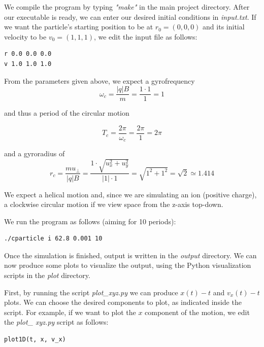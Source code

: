 \documentclass[11pt]{report}
\begin{document}
We compile the program by typing \emph{"make"} in the main project directory. After our executable is ready, we can enter our desired initial conditions in \emph{input.txt}. If we want the particle's starting position to be at $r_0 = (0,0,0)$ and its initial velocity to be $v_0 = (1, 1, 1)$, we edit the input file as follows:

\begin{lstlisting}
r 0.0 0.0 0.0
v 1.0 1.0 1.0
\end{lstlisting}

From the parameters given above, we expect a gyrofrequency 
\begin{equation}
\omega_c = \frac{|q|B}{m} = \frac{1 \cdot 1}{1} = 1
\end{equation}

and thus a period of the circular motion

\begin{equation}
T_c = \frac{2 \pi}{\omega_c} = \frac{2 \pi}{1} = 2 \pi
\end{equation}

and a gyroradius of 
\begin{equation}
r_c = \frac{m u_{\bot}}{|q|B} = \frac{1 \cdot \sqrt{u_x^2 + u_y^2}}{|1| \cdot 1}
= \sqrt{1^2 + 1^2} = \sqrt{2} \simeq 1.414
\end{equation}

We expect a helical motion and, since we are simulating an ion (positive charge), a clockwise circular motion if we view space from the z-axis top-down.
\newline

We run the program as follows (aiming for 10 periods):

\begin{lstlisting}
./cparticle i 62.8 0.001 10
\end{lstlisting}

Once the simulation is finished, output is written in the \emph{output} directory. We can now produce some plots to visualize the output, using the Python visualization scripts in the \emph{plot} directory.
\newline

First, by running the script \emph{plot\_xyz.py} we can produce $x(t) - t$ and $v_x(t) - t$ plots. We can choose the desired components to plot, as indicated inside the script. For example, if we want to plot the $x$ component of the motion, we edit the \emph{plot\_ xyz.py} script as follows:

\begin{lstlisting}
plot1D(t, x, v_x)
\end{lstlisting}
\end{document}
